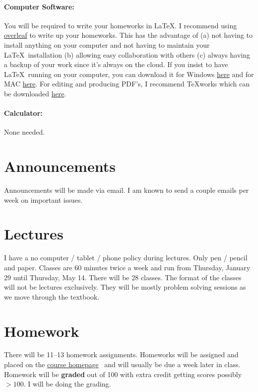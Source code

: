 \documentclass[12pt]{article}
\newcommand{\coursewebpage}{\href{https://github.com/kapelner/QC_Real_Analysis_Ind_Spring_2015}{course homepage}}
\begin{document}
\paragraph{Computer Software:} You will be required to write your homeworks in \LaTeX. I recommend using \href{http://overleaf.com}{overleaf} to write up your homeworks. This has the advantage of (a) not having to install anything on your computer and not having to maintain your \LaTeX ~installation (b) allowing easy collaboration with others (c) always having a backup of your work since it's always on the cloud. If you insist to have \LaTeX ~running on your computer, you can download it for Windows \href{http://www.miktex.org/download}{here} and for MAC \href{http://www.tug.org/mactex/}{here}. For editing and producing PDF's, I recommend \TeX works which can be downloaded \href{http://www.tug.org/texworks/#Getting_TeXworks}{here}. 

\paragraph{Calculator:} None needed.

\section*{Announcements}

Announcements will be made via email. I am known to send a couple emails per week on important issues.

\section*{Lectures}

I have a no computer / tablet / phone policy during lectures. Only pen / pencil and paper. Classes are 60 minutes twice a week and run from Thursday, January 29 until Thursday, May 14. There will be 28 classes. The format of the classes will not be lectures exclusively. They will be mostly problem solving sessions as we move through the textbook.


\section*{Homework}

There will be 11--13 homework assignments. Homeworks will be assigned and placed on the \coursewebpage~ and will usually be due a week later in class. Homework will be \textbf{graded} out of 100 with extra credit getting scores possibly $> 100$. I will be doing the grading. 
\end{document}
